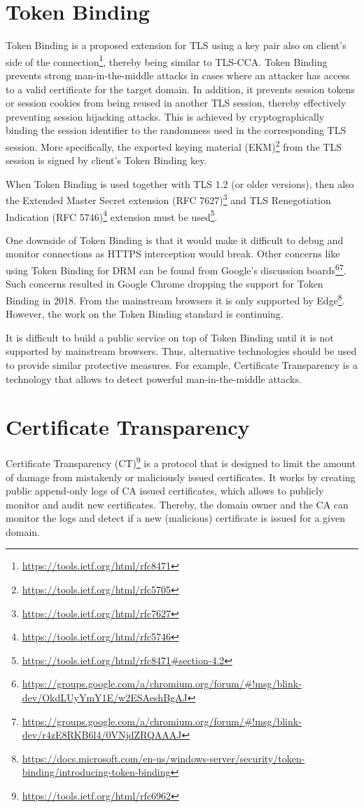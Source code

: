 \section{Token Binding}
\label{sec:token_binding}
Token Binding is a proposed extension for TLS using a key pair also on client's side of the connection\footnote{\url{https://tools.ietf.org/html/rfc8471}}, thereby being similar to TLS-CCA. Token Binding prevents strong man-in-the-middle attacks in cases where an attacker has access to a valid certificate for the target domain. In addition, it prevents session tokens or session cookies from being reused in another TLS session, thereby effectively preventing session hijacking attacks. This is achieved by cryptographically binding the session identifier to the randomness used in the corresponding TLS session. More specifically, the exported keying material (EKM)\footnote{\url{https://tools.ietf.org/html/rfc5705}} from the TLS session is signed by client's Token Binding key. 

When Token Binding is used together with TLS 1.2 (or older versions), then also the Extended Master Secret extension (RFC 7627)\footnote{\url{https://tools.ietf.org/html/rfc7627}} and TLS Renegotiation Indication (RFC 5746)\footnote{\url{https://tools.ietf.org/html/rfc5746}} extension must be used\footnote{\url{https://tools.ietf.org/html/rfc8471\#section-4.2}}.

One downside of Token Binding is that it would make it difficult to debug and monitor connections as HTTPS interception would break. Other concerns like using Token Binding for DRM can be found from Google's discussion boards\footnote{\url{https://groups.google.com/a/chromium.org/forum/\#!msg/blink-dev/OkdLUyYmY1E/w2ESAeshBgAJ}}\footnote{\url{https://groups.google.com/a/chromium.org/forum/\#!msg/blink-dev/r4zE8RKB6l4/0VNjdZRQAAAJ}}. Such concerns resulted in Google Chrome dropping the support for Token Binding in 2018. From the mainstream browsers it is only supported by Edge\footnote{\url{https://docs.microsoft.com/en-us/windows-server/security/token-binding/introducing-token-binding}}. However, the work on the Token Binding standard is continuing.

It is difficult to build a public service on top of Token Binding until it is not supported by mainstream browsers. Thus, alternative technologies should be used to provide similar protective measures. For example, Certificate Transparency is a technology that allows to detect powerful man-in-the-middle attacks.


\section{Certificate Transparency}
\label{sec:certificate_transparency}
Certificate Transparency (CT)\footnote{\url{https://tools.ietf.org/html/rfc6962}} is a protocol that is designed to limit the amount of damage from mistakenly or maliciously issued certificates. It works by creating public append-only logs of CA issued certificates, which allows to publicly monitor and audit new certificates. Thereby, the domain owner and the CA can monitor the logs and detect if a new (malicious) certificate is issued for a given domain.

